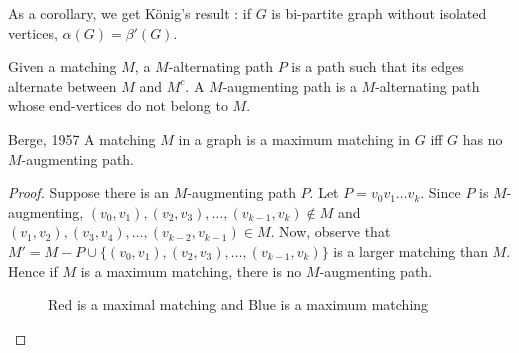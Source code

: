 \documentclass[../basic_graph_theory.tex]{subfiles}
\begin{document}
%
As a corollary, we get K\"{o}nig's result : if $G$ is bi-partite graph without isolated vertices, $\alpha(G) = \beta'(G)$.
%
\begin{defn}
    Given a matching $M$, a $M$-alternating path $P$ is a path such that its edges alternate between $M$ and $M^c$.  A $M$-augmenting path is a $M$-alternating path whose end-vertices do not belong to $M$.
\end{defn}
%
\begin{Thm}{Berge, 1957}{}
    A matching $M$ in a graph is a maximum matching in $G$ iff $G$ has no $M$-augmenting path.
\end{Thm}
%
\begin{proof}
    Suppose there is an $M$-augmenting path $P$. Let $P = v_0v_1\ldots v_k$. Since $P$ is $M$-augmenting, $(v_0,v_1),(v_2,v_3),\ldots,(v_{k-1},v_k) \notin M$ and $(v_1,v_2), (v_3,v_4),\ldots,(v_{k-2},v_{k-1}) \in M$.  Now, observe that $M' = M - P \cup \{ (v_0,v_1),(v_2,v_3),\ldots,(v_{k-1},v_k) \}$ is a larger matching than $M$. Hence if $M$ is a maximum matching, there is no $M$-augmenting path.
    \begin{figure}[htbp]
        \centering
        \caption{Red is a maximal matching and Blue is a maximum matching}
        \label{fig:matching paths}
    \end{figure}

\end{proof}
\end{document}
